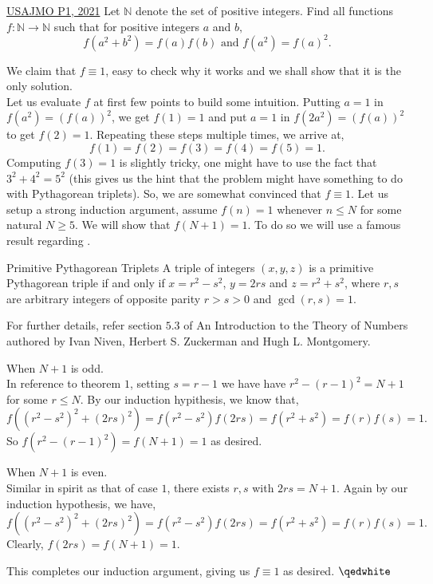 \begin{problem}{1}{\href{https://artofproblemsolving.com/community/q2h2529938p34791441}{USAJMO P1, 2021}}
	Let $\mathbb{N}$ denote the set of positive integers. Find all functions $f : \mathbb{N} \rightarrow \mathbb{N}$ such that for positive integers $a$ and $b,$\[f(a^2 + b^2) = f(a)f(b) \text{ and } f(a^2) = f(a)^2.\]
	\begin{solution} We claim that $f\equiv 1$, easy to check why it works and we shall show that it is the only solution.\\
Let us evaluate $f$ at first few points to build some intuition. Putting $a=1$ in $f(a^2)=(f(a))^2$, we get $f(1)=1$ and put $a=1$ in $f(2a^2)=(f(a))^2$ to get $f(2)=1$. Repeating these steps multiple times, we arrive at,
$$f(1)=f(2)=f(3)=f(4)=f(5)=1.$$Computing $f(3)=1$ is slightly tricky, one might have to use the fact that $3^2+4^2=5^2$ (this gives us the hint that the problem might have something to do with Pythagorean triplets). So, we are somewhat convinced that $f\equiv 1$.
Let us setup a strong induction argument, assume $f(n)=1$ whenever $n\le N$ for some natural $N\ge 5$. We will show that $f(N+1)=1$. To do so we will use a famous result regarding .
		\begin{theorem}{1}{Primitive Pythagorean Triplets} A triple of integers $(x,y,z)$ is a primitive Pythagorean triple if and only if $x=r^2-s^2$, $y=2rs$ and $z=r^2+s^2$, where $r,s$ are arbitrary integers of opposite parity $r>s>0$ and $\gcd(r,s)=1$.
	\end{theorem}
	For further details, refer section $5.3$ of An Introduction to the Theory of Numbers authored by Ivan Niven, Herbert S. Zuckerman and Hugh L. Montgomery.\\

	\begin{mycases}
		\item When $N+1$ is odd.\\
		In reference to theorem $1$, setting $s=r-1$ we have have $r^2-(r-1)^2=N+1$ for some $r\le N$. By our induction hypithesis, we know that,
		$$f((r^2-s^2)^2+(2rs)^2)=f(r^2-s^2)f(2rs)=f(r^2+s^2)=f(r)f(s)=1.$$So $f(r^2-(r-1)^2)=f(N+1)=1$ as desired.

		\item When $N+1$ is even.\\
		Similar in spirit as that of case $1$, there exists $r,s$ with $2rs=N+1$. Again by our induction hypothesis, we have,
		$$f((r^2-s^2)^2+(2rs)^2)=f(r^2-s^2)f(2rs)=f(r^2+s^2)=f(r)f(s)=1.$$Clearly, $f(2rs)=f(N+1)=1$.
	\end{mycases}

	\noindent This completes our induction argument, giving us $f\equiv 1$ as desired. $\qedwhite$
	\end{solution}
\end{problem}
